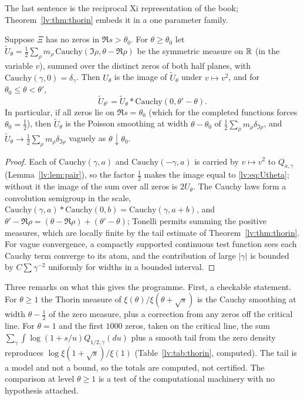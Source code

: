 The last sentence is the reciprocal Xi representation of the book; Theorem~\ref{lv:thm:thorin} embeds it in a one parameter family.

\begin{theorem}\label{lv:thm:semigroup}
Suppose $\Xi$ has no zeros in $\Re s>\theta_0$. For $\theta\ge\theta_0$ let $\widetilde U_\theta=\frac12\sum_\rho m_\rho\,\mathrm{Cauchy}(\Im\rho,\theta-\Re\rho)$ be the symmetric measure on $\mathbb{R}$ (in the variable $v$), summed over the distinct zeros of both half planes, with $\mathrm{Cauchy}(\gamma,0)=\delta_\gamma$. Then $U_\theta$ is the image of $\widetilde U_\theta$ under $v\mapsto v^2$, and for $\theta_0\le\theta<\theta'$,
\[
\widetilde U_{\theta'}=\widetilde U_\theta*\mathrm{Cauchy}(0,\theta'-\theta).
\]
In particular, if all zeros lie on $\Re s=\theta_0$ (which for the completed functions forces $\theta_0=\frac12$), then $\widetilde U_\theta$ is the Poisson smoothing at width $\theta-\theta_0$ of $\frac12\sum_\rho m_\rho\delta_{\Im\rho}$, and $\widetilde U_\theta\to\frac12\sum_\rho m_\rho\delta_{\Im\rho}$ vaguely as $\theta\downarrow\theta_0$.
\end{theorem}

\begin{proof}
Each of $\mathrm{Cauchy}(\gamma,a)$ and $\mathrm{Cauchy}(-\gamma,a)$ is carried by $v\mapsto v^2$ to $Q_{a,\gamma}$ (Lemma~\ref{lv:lem:pair}), so the factor $\frac12$ makes the image equal to \eqref{lv:eq:Utheta}; without it the image of the sum over all zeros is $2U_\theta$. The Cauchy laws form a convolution semigroup in the scale, $\mathrm{Cauchy}(\gamma,a)*\mathrm{Cauchy}(0,b)=\mathrm{Cauchy}(\gamma,a+b)$, and $\theta'-\Re\rho=(\theta-\Re\rho)+(\theta'-\theta)$; Tonelli permits summing the positive measures, which are locally finite by the tail estimate of Theorem~\ref{lv:thm:thorin}. For vague convergence, a compactly supported continuous test function sees each Cauchy term converge to its atom, and the contribution of large $|\gamma|$ is bounded by $C\sum\gamma^{-2}$ uniformly for widths in a bounded interval.
\end{proof}

Three remarks on what this gives the programme. First, a checkable statement. For $\theta\ge1$ the Thorin measure of $\xi(\theta)/\xi(\theta+\sqrt s)$ is the Cauchy smoothing at width $\theta-\frac12$ of the zero measure, plus a correction from any zeros off the critical line. For $\theta=1$ and the first $1000$ zeros, taken on the critical line, the sum $\sum_\gamma\int\log(1+s/u)Q_{1/2,\gamma}(du)$ plus a smooth tail from the zero density reproduces $\log\xi(1+\sqrt s)/\xi(1)$ (Table~\ref{lv:tab:thorin}, computed). The tail is a model and not a bound, so the totals are computed, not certified. The comparison at level $\theta\ge1$ is a test of the computational machinery with no hypothesis attached.

